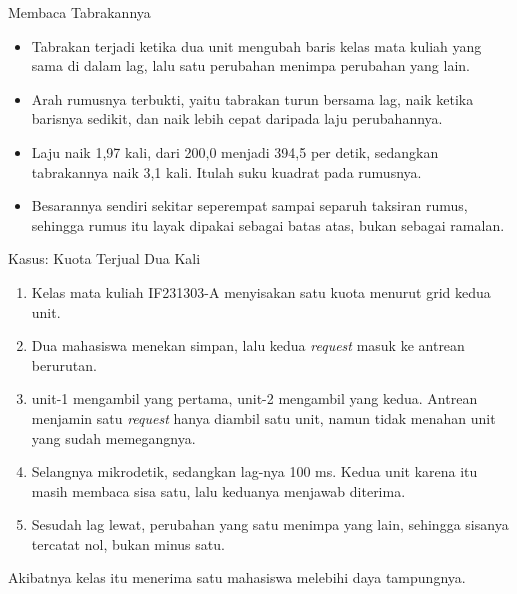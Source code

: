 \documentclass[aspectratio=169, table, 12pt]{beamer}
\begin{document}
\begin{frame}{{\Large Membaca Tabrakannya}}
  \vspace{10pt}
  \begin{itemize}\small
    \item Tabrakan terjadi ketika dua unit mengubah baris kelas mata kuliah yang sama di
          dalam lag, lalu satu perubahan menimpa perubahan yang lain.
    \item Arah rumusnya terbukti, yaitu tabrakan turun bersama lag, naik ketika
          barisnya sedikit, dan naik lebih cepat daripada laju perubahannya.
    \item Laju naik 1,97 kali, dari 200,0 menjadi 394,5 per detik, sedangkan
          tabrakannya naik 3,1 kali. Itulah suku kuadrat pada rumusnya.
    \item Besarannya sendiri sekitar seperempat sampai separuh taksiran rumus,
          sehingga rumus itu layak dipakai sebagai batas atas, bukan sebagai
          ramalan.
  \end{itemize}
\end{frame}

\begin{frame}{{\Large Kasus: Kuota Terjual Dua Kali}}
  \vspace{8pt}
  \begin{enumerate}\small
    \item Kelas mata kuliah IF231303-A menyisakan satu kuota menurut grid kedua
          unit.
    \item Dua mahasiswa menekan simpan, lalu kedua \textit{request} masuk ke
          antrean berurutan.
    \item unit-1 mengambil yang pertama, unit-2 mengambil yang kedua. Antrean
          menjamin satu \textit{request} hanya diambil satu unit, namun tidak
          menahan unit yang sudah memegangnya.
    \item Selangnya mikrodetik, sedangkan lag-nya 100 ms. Kedua unit karena itu
          masih membaca sisa satu, lalu keduanya menjawab diterima.
    \item Sesudah lag lewat, perubahan yang satu menimpa yang lain, sehingga
          sisanya tercatat nol, bukan minus satu.
  \end{enumerate}

  \vspace{6pt}
  {\small Akibatnya kelas itu menerima satu mahasiswa melebihi daya
  tampungnya.}
\end{frame}
\end{document}
